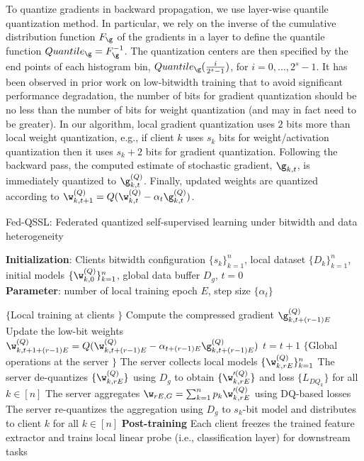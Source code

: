 To quantize gradients in backward propagation, we use layer-wise quantile quantization method. In particular, we rely on the inverse of the cumulative distribution function $F_{\g}$ of the gradients in a layer to define the quantile function $Quantile_{\g} = F^{-1}_{\g}$. The quantization centers are then specified by the end points of each histogram bin, $Quantile_{\g}(\frac{i}{2^s-1})$, for $i = 0, \dots, 2^s-1$. It has been observed in prior work on low-bitwidth training \cite{zhou2016dorefa} that to avoid significant performance degradation, the number of bits for gradient quantization should be no less than the number of bits for weight quantization (and may in fact need to be greater). In our algorithm, local gradient quantization uses $2$ bits more than local weight quantization, e.g., if client $k$ uses $s_k$ bits for weight/activation quantization then it uses $s_k+2$ bits for gradient quantization. Following the backward pass, the computed estimate of stochastic gradient, $\g_{k, t}$, is immediately quantized to $\g^{(Q)}_{k, t}$. Finally, updated weights are quantized according to $\w^{(Q)}_{k, t+1} = Q(\w^{(Q)}_{k, t} - \alpha_t \g^{(Q)}_{k, t})$.

\begin{algorithm}[tb]
\caption{Fed-QSSL: Federated quantized self-supervised learning under bitwidth and data heterogeneity}
\label{alg:algorithm2}
\textbf{Initialization}: Clients bitwidth configuration $\{s_k \}_{k=1}^n$, local dataset $\{ D_k\}_{k=1}^n$, initial models $\{\w^{(Q)}_{k, 0} \}_{k=1}^n $, global data buffer $D_{g}$, $t = 0$ \\
\textbf{Parameter}: number of local training epoch $E$, step size $\{\alpha_t\}$
\begin{algorithmic}[1] %
\STATE $\{$Local training at clients $\}$
\STATE Compute the compressed gradient $\g^{(Q)}_{k, t+(r-1)E}$
\STATE Update the low-bit weights $\w^{(Q)}_{k, t+1+(r-1)E} = Q(\w^{(Q)}_{k, t+(r-1)E} - \alpha_{t+(r-1)E} \g^{(Q)}_{k, t+(r-1)E}) $
\STATE $t = t+ 1$
\ENDFOR
\ENDFOR
\STATE $\{$Global operations at the server $\}$
\STATE The server collects local models $\{\w^{(Q)}_{k, rE} \}_{k=1}^n$
\STATE The server de-quantizes $\{\w^{(Q)}_{k, rE} \}$ using $D_{g}$ to obtain $\{\w'^{(Q)}_{k, rE} \}$ and loss $\{L_{DQ_k} \}$ for all $k \in [n]$
\STATE The server aggregates  $\w_{rE, G} = \sum_{k=1}^n p_k \w'^{(Q)}_{k, rE}$ using DQ-based losses
\STATE The server re-quantizes the aggregation using $D_{g}$ to $s_k$-bit model and distributes to client $k$ for all $k \in [n]$
\ENDFOR
\STATE \textbf{Post-training} Each client freezes the trained feature extractor and trains local linear probe (i.e., classification layer) for downstream tasks
\end{algorithmic}
\end{algorithm}


